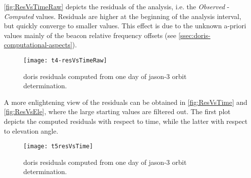 
\autoref{fig:ResVsTimeRaw} depicts the residuals of the analysis, i.e. the \emph{Observed} 
- \emph{Computed} values. Residuals are higher at the beginning of the analysis interval, but 
quickly converge to smaller values. This effect is due to the unknown a-priori values mainly of 
the beacon relative frequency offsets (see \autoref{ssec:doris-computational-aspects}). 
\begin{figure}[ht]
    \centering
    \texttt{[image: t4-resVsTimeRaw]}
    \caption{\gls{doris} residuals computed from one day of \gls{jason}-3 orbit determination.}
    \label{fig:ResVsTimeRaw}
\end{figure}

A more enlightening view of the residuals can be obtained in \autoref{fig:ResVsTime} and 
\autoref{fig:ResVsEle}, where the large starting values are filtered out. The first 
plot depicts the computed residuals with respect to time, while the latter with respect to 
elevation angle. 
\begin{figure}[ht]
    \centering
    \texttt{[image: t5resVsTime]}
    \caption{\gls{doris} residuals computed from one day of \gls{jason}-3 orbit determination.}
    \label{fig:ResVsTime}
\end{figure}

